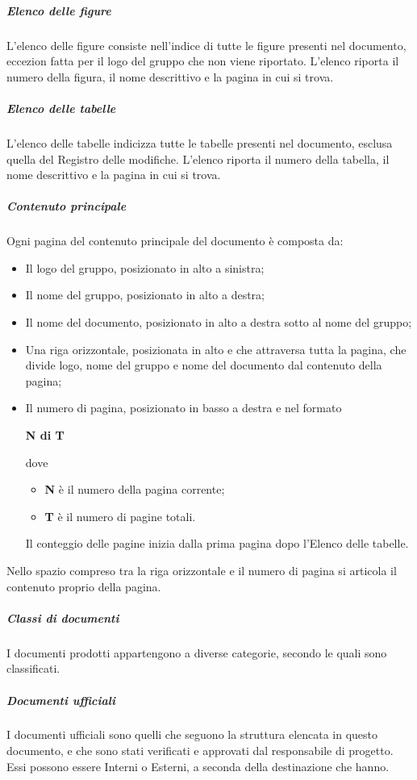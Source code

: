 \documentclass[../norme-di-progetto.tex]{subfiles}
\begin{document}
\subparagraph*{Elenco delle figure}
L'elenco delle figure consiste nell'indice di tutte le figure presenti nel documento, eccezion fatta per il logo del gruppo che non viene riportato. L'elenco riporta il numero della figura, il nome descrittivo e la pagina in cui si trova.

\subparagraph*{Elenco delle tabelle}
L'elenco delle tabelle indicizza tutte le tabelle presenti nel documento, esclusa quella del Registro delle modifiche. L'elenco riporta il numero della tabella, il nome  descrittivo e la pagina in cui si trova.

\subparagraph*{Contenuto principale}
Ogni pagina del contenuto principale del documento è composta da:
\begin{itemize}
  \item Il logo del gruppo, posizionato in alto a sinistra;
  \item Il nome del gruppo, posizionato in alto a destra;
  \item Il nome del documento, posizionato in alto a destra sotto al nome del gruppo;
  \item Una riga orizzontale, posizionata in alto e che attraversa tutta la pagina, che divide logo, nome del gruppo e nome del documento dal contenuto della pagina;
  \item Il numero di pagina, posizionato in basso a destra e nel formato \\ \begin{center}
    \centering
    \textbf{N di T}
  \end{center} dove
\begin{itemize}
  \item \textbf{N} è il numero della pagina corrente;
  \item \textbf{T} è il numero di pagine totali.
\end{itemize}
Il conteggio delle pagine inizia dalla prima pagina dopo l'Elenco delle tabelle.
\end{itemize}
Nello spazio compreso tra la riga orizzontale e il numero di pagina si articola il contenuto proprio della pagina.

\subparagraph{Classi di documenti}
I documenti prodotti appartengono a diverse categorie, secondo le quali sono classificati.

\subparagraph*{Documenti ufficiali}
I documenti ufficiali sono quelli che seguono la struttura elencata in questo documento, e che sono stati verificati e approvati dal responsabile di progetto. Essi possono essere Interni o Esterni, a seconda della destinazione che hanno.
\end{document}
